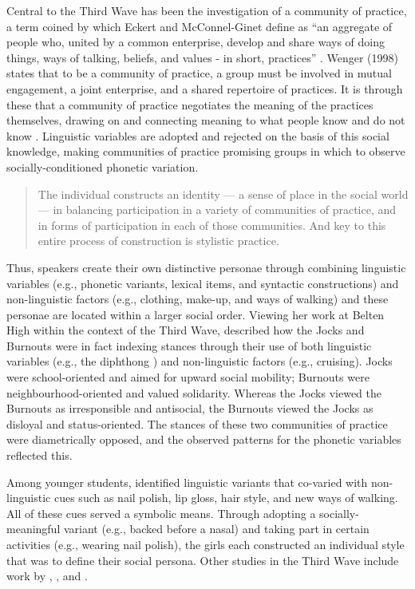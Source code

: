 Central to the Third Wave has been the investigation of a community of practice, a term coined by  which Eckert and McConnel-Ginet define as ``an aggregate of people who, united by a common enterprise, develop and share ways of doing things, ways of talking, beliefs, and values - in short, practices'' \cite[186]{eckertmcconnellginet1999}.  Wenger (1998) states that to be a community of practice, a group must be involved in mutual engagement, a joint enterprise, and a shared repertoire of practices.  It is through these that a community of practice negotiates the meaning of the practices themselves, drawing on and connecting meaning to what people know and do not know  \cite[73-85]{wenger1998}.  Linguistic variables are adopted and rejected on the basis of this social knowledge, making communities of practice promising groups in which to observe socially-conditioned phonetic variation.


\begin{quote}
The individual constructs an identity --- a sense of place in the social world --- in balancing participation in a variety of communities of practice, and in forms of participation in each of those communities.  And key to this entire process of construction is stylistic practice. \cite[17]{eckert2005}
\end{quote}

\noindent Thus, speakers create their own distinctive personae through combining linguistic variables (e.g., phonetic variants, lexical items, and syntactic constructions) and non-linguistic factors (e.g., clothing, make-up, and ways of walking) and these personae are located within a larger social order.  Viewing her work at Belten High within the context of the Third Wave,  described how the Jocks and Burnouts were in fact indexing stances through their use of both linguistic variables (e.g., the diphthong ) and non-linguistic factors (e.g., cruising).  Jocks were school-oriented and aimed for upward social mobility; Burnouts were neighbourhood-oriented and valued solidarity.  Whereas the Jocks viewed the Burnouts as irresponsible and antisocial, the Burnouts viewed the Jocks as disloyal and status-oriented.  \noindent The stances of these two communities of practice were diametrically opposed, and the observed patterns for the phonetic variables reflected this.

Among younger students,  identified linguistic variants that co-varied with non-linguistic cues such as nail polish, lip gloss, hair style, and new ways of walking.  All of these cues served a symbolic means.  Through adopting a socially-meaningful variant (e.g., backed \textipa{/\ae/} before a nasal) and taking part in certain activities (e.g., wearing nail polish), the girls each constructed an individual style that was to define their social persona.  Other studies in the Third Wave include work by , , and .

